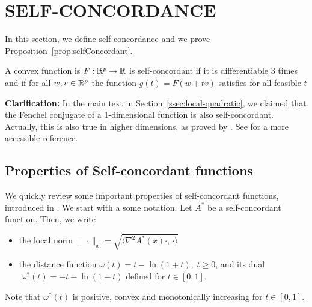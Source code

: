 \section{SELF-CONCORDANCE}
\label{app:self-concordant}

In this section, we define self-concordance and we prove Proposition~\ref{prop:selfConcordant}.

\begin{definition}
\label{def:self-concordance}
A convex function is $F:\mathbb{R}^p \rightarrow \mathbb{R}$ is self-concordant if it is differentiable $3$ times and if for all $w, v \in\mathbb{R}^p$ the function $g(t) = F(w+tv)$ satisfies for all feasible $t$
\end{definition}


{\bf Clarification:} In the main text in Section~\ref{ssec:local-quadratic}, we claimed that the Fenchel conjugate of a 1-dimensional function is also self-concordant. 
Actually, this is also true in higher dimensions, as proved by \citet{nesterov1994interior}. See \citet[Prop.~6]{sun2019generalized} for a more accessible reference.


\subsection{Properties of Self-concordant functions}

We quickly review some important properties of self-concordant functions, introduced in \citep{nesterov2003introductory}. We start with a some notation. Let $A^*$ be a self-concordant function. Then, we write
\begin{itemize}
	\item the local norm $\|\cdot\|_x = \sqrt{ \langle \nabla^2A^*(x)\cdot,\, \cdot \rangle }$ 
	\item the distance function $\omega(t) = t-\ln (1+t),\;t\geq 0$, and its dual $\;\omega^*(t) = -t-\ln(1-t)$ defined for $t\in [0,1]$.
\end{itemize}
Note that $\omega^*(t)$ is positive, convex and monotonically increasing for $t\in[0,1]$.

